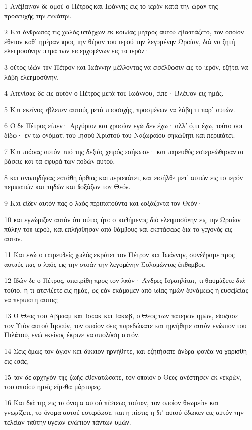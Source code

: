 \par 1 Ανέβαινον δε ομού ο Πέτρος και Ιωάννης εις το ιερόν κατά την ώραν της προσευχής την εννάτην.
\par 2 Και άνθρωπός τις χωλός υπάρχων εκ κοιλίας μητρός αυτού εβαστάζετο, τον οποίον έθετον καθ' ημέραν προς την θύραν του ιερού την λεγομένην Ωραίαν, διά να ζητή ελεημοσύνην παρά των εισερχομένων εις το ιερόν·
\par 3 ούτος ιδών τον Πέτρον και Ιωάννην μέλλοντας να εισέλθωσιν εις το ιερόν, εζήτει να λάβη ελεημοσύνην.
\par 4 Ατενίσας δε εις αυτόν ο Πέτρος μετά του Ιωάννου, είπε· Βλέψον εις ημάς.
\par 5 Και εκείνος έβλεπεν αυτούς μετά προσοχής, προσμένων να λάβη τι παρ' αυτών.
\par 6 Ο δε Πέτρος είπεν· Αργύριον και χρυσίον εγώ δεν έχω· αλλ' ό,τι έχω, τούτο σοι δίδω· εν τω ονόματι του Ιησού Χριστού του Ναζωραίου σηκώθητι και περιπάτει.
\par 7 Και πιάσας αυτόν από της δεξιάς χειρός εσήκωσε· και παρευθύς εστερεώθησαν αι βάσεις και τα σφυρά των ποδών αυτού,
\par 8 και αναπηδήσας εστάθη όρθιος και περιεπάτει, και εισήλθε μετ' αυτών εις το ιερόν περιπατών και πηδών και δοξάζων τον Θεόν.
\par 9 Και είδεν αυτόν πας ο λαός περιπατούντα και δοξάζοντα τον Θεόν·
\par 10 και εγνώριζον αυτόν ότι ούτος ήτο ο καθήμενος διά ελεημοσύνην εις την Ωραίαν πύλην του ιερού, και επλήσθησαν από θάμβους και εκστάσεως διά το γεγονός εις αυτόν.
\par 11 Και ενώ ο ιατρευθείς χωλός εκράτει τον Πέτρον και Ιωάννην, συνέδραμε προς αυτούς πας ο λαός εις την στοάν την λεγομένην Σολομώντος έκθαμβοι.
\par 12 Ιδών δε ο Πέτρος, απεκρίθη προς τον λαόν· Άνδρες Ισραηλίται, τι θαυμάζετε διά τούτο, ή τι ατενίζετε εις ημάς, ως εάν εκάμομεν από ιδίας ημών δυνάμεως ή ευσεβείας να περιπατή αυτός;
\par 13 Ο Θεός του Αβραάμ και Ισαάκ και Ιακώβ, ο Θεός των πατέρων ημών, εδόξασε τον Υιόν αυτού Ιησούν, τον οποίον σεις παρεδώκατε και ηρνήθητε αυτόν ενώπιον του Πιλάτου, ενώ εκείνος έκρινε να απολύση αυτόν.
\par 14 Σεις όμως τον άγιον και δίκαιον ηρνήθητε, και εζητήσατε άνδρα φονέα να χαρισθή εις εσάς,
\par 15 τον δε αρχηγόν της ζωής εθανατώσατε, τον οποίον ο Θεός ανέστησεν εκ νεκρών, του οποίου ημείς είμεθα μάρτυρες.
\par 16 Και διά της εις το όνομα αυτού πίστεως τούτον, τον οποίον θεωρείτε και γνωρίζετε, το όνομα αυτού εστερέωσε, και η πίστις η δι' αυτού έδωκεν εις αυτόν την τελείαν ταύτην υγείαν ενώπιον πάντων υμών.
